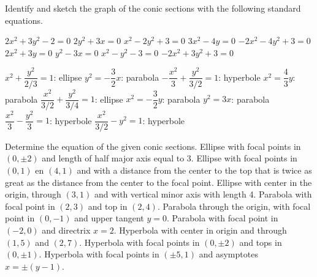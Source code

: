 \begin{Exercise} Identify and sketch the graph of the conic sections with the following standard equations. 
		\begin{multicols}{2}
    		\Question[difficulty = 1] $2x^2+3y^2-2=0$
    		\Question[difficulty = 1] $2y^2+3x=0$
    		\Question[difficulty = 1] $x^2-2y^2+3=0$
    		\Question[difficulty = 1] $3x^2-4y=0$
    		\Question[difficulty = 1] $-2x^2-4y^2+3=0$
    		\Question[difficulty = 1] $2x^2+3y=0$
    		\Question[difficulty = 1] $y^2-3x=0$
    		\Question[difficulty = 1] $x^2-y^2-3=0$
    		\Question[difficulty = 1] $-2x^2+3y^2+3=0$
    		\EndCurrentQuestion
		\end{multicols}

\end{Exercise}

\begin{Answer}\phantom{}
    \begin{multicols}{2}
    
    	\Question $x^2 + \dfrac{y^2}{2/3}=1$:   ellipse
    	\Question $y^2 = -\dfrac{3}{2}x$: parabola
    	\Question $-\dfrac{x^2}{3} + \dfrac{y^2}{3/2} = 1$: hyperbole
    	\Question $x^2 = \dfrac{4}{3}y$: parabola
    	\Question $\dfrac{x^2}{3/2} + \dfrac{y^2}{3/4}=1$:  ellipse
    	\Question $x^2 = -\dfrac{3}{2}y$: parabola
    	\Question $y^2 = 3x$: parabola
    	\Question $\dfrac{x^2}{3} - \dfrac{y^2}{3} = 1$: hyperbole
    	\Question $\dfrac{x^2}{3/2} - y^2 = 1$: hyperbole
    \EndCurrentQuestion
    \end{multicols}
\end{Answer}

\ifanalysis\pagebreak\fi
\begin{Exercise} Determine the equation of the given conic sections. 
	\Question[difficulty = 1] Ellipse with focal points in $(0, \pm 2)$ and length of half major axis equal to 3.
	\Question[difficulty = 2] Ellipse with focal points in $(0, 1)$ en $(4,1)$ and with a distance from the center to the top that is twice as great as the distance from the center to the focal point. 
	\Question[difficulty = 1] Ellipse with center in the origin, through $(3,1)$ and with vertical minor axis with length 4. 
	\Question[difficulty = 1] Parabola with focal point in $(2,3)$ and top in $(2,4)$.
	\Question[difficulty = 1] Parabola through the origin, with focal point in $(0,-1)$ and upper tangent $y=0$. 
	\Question[difficulty = 1] Parabola with focal point in $(-2,0)$ and directrix $x=2$. 
	\Question[difficulty = 1] Hyperbola with center in origin and through $(1,5)$ and $(2,7)$.
	\Question[difficulty = 1] Hyperbola with focal points in $(0, \pm 2)$ and tops in $(0, \pm 1)$.
	\Question[difficulty = 2] Hyperbola with focal points in $(\pm 5, 1)$ and asymptotes $x = \pm (y-1)$.

\end{Exercise}

